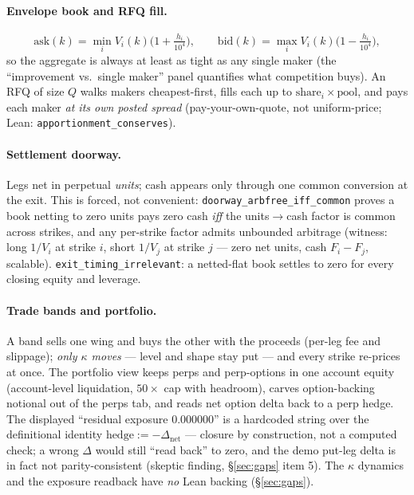\documentclass[11pt]{article}
\begin{document}
\paragraph{Envelope book and RFQ fill.}
\begin{equation}
\mathrm{ask}(k) = \min_i V_i(k)\bigl(1+\tfrac{h_i}{10^4}\bigr), \qquad
\mathrm{bid}(k) = \max_i V_i(k)\bigl(1-\tfrac{h_i}{10^4}\bigr),
\end{equation}
so the aggregate is always at least as tight as any single maker (the ``improvement vs.\ single
maker'' panel quantifies what competition buys). An RFQ of size $Q$ walks makers
cheapest-first, fills each up to $\text{share}_i \times \text{pool}$, and pays each maker
\emph{at its own posted spread} (pay-your-own-quote, not uniform-price; Lean:
\texttt{apportionment\_conserves}).

\paragraph{Settlement doorway.} Legs net in perpetual \emph{units}; cash appears only through
one common conversion at the exit. This is forced, not convenient:
\texttt{doorway\_arbfree\_iff\_common} proves a book netting to zero units pays zero cash
\emph{iff} the units$\to$cash factor is common across strikes, and any per-strike factor admits
unbounded arbitrage (witness: long $1/V_i$ at strike $i$, short $1/V_j$ at strike $j$ --- zero
net units, cash $F_i - F_j$, scalable). \texttt{exit\_timing\_irrelevant}: a netted-flat book
settles to zero for every closing equity and leverage.

\paragraph{Trade bands and portfolio.} A band sells one wing and buys the other with the
proceeds (per-leg fee and slippage); \emph{only $\kappa$ moves} --- level and shape stay put ---
and every strike re-prices at once. The portfolio view keeps perps and perp-options in one
account equity (account-level liquidation, $50\times$ cap with headroom), carves option-backing
notional out of the perps tab, and reads net option delta back to a perp hedge. The displayed
``residual exposure 0.000000'' is a hardcoded string over the definitional identity
$\text{hedge} := -\Delta_{\text{net}}$ --- closure by construction, not a computed check; a
wrong $\Delta$ would still ``read back'' to zero, and the demo put-leg delta is in fact not
parity-consistent (skeptic finding, \S\ref{sec:gaps} item 5). The $\kappa$ dynamics and the
exposure readback have \emph{no} Lean backing (\S\ref{sec:gaps}).
\end{document}
